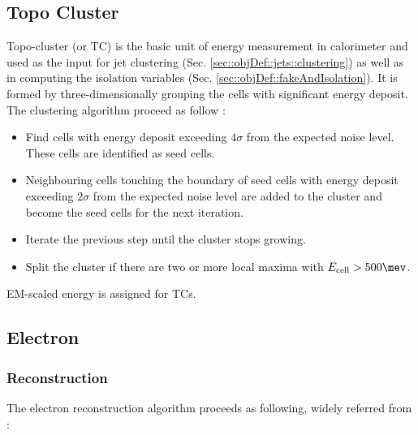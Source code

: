 \subsection{Topo Cluster} \label{sec::objDef::TopoCluster}
Topo-cluster (or TC) is the basic unit of energy measurement in calorimeter and used as the input for jet clustering  (Sec. \ref{sec::objDef::jets::clustering}) as well as in computing the isolation variables (Sec. \ref{sec::objDef::fakeAndIsolation}). 
It is formed by three-dimensionally grouping the cells with significant energy deposit.
The clustering algorithm proceed as follow \cite{138_topoClustering_Run1}:
\begin{itemize}
\item Find cells with energy deposit exceeding $4\sigma$ from the expected noise level. These cells are identified as seed cells.
\item Neighbouring cells touching the boundary of seed cells with energy deposit exceeding $2\sigma$ from the expected noise level are added to the cluster and become the seed cells for the next iteration.
\item Iterate the previous step until the cluster stops growing.
\item Split the cluster if there are two or more local maxima with $E_{\mathrm{cell}}>500\mev$.
\end{itemize}
EM-scaled energy is assigned for TCs. \\




\subsection{Electron} \label{sec::objDef::electrons}

\subsubsection{Reconstruction} \label{sec::objDef::electrons::reco}
The electron reconstruction algorithm proceeds as following, widely referred from \cite{156_ElectronEffMeas_2015data}: 

